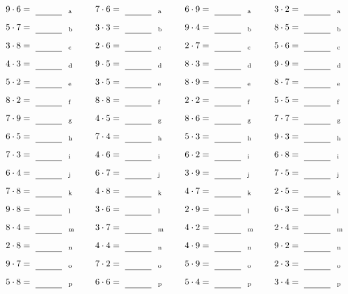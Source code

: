 \documentclass
[
  draft    = true,
  fontsize = 11pt,
  parskip  = half-
]
{scrartcl}
\begin{document}
\par\vfill\par
\begin{align*}
    \pline{9\cdot6}&=\rline{a}
  & \pline{7\cdot6}&=\rline{a}
  & \pline{6\cdot9}&=\rline{a}
  & \pline{3\cdot2}&=\rline{a} \\[1ex]
    \pline{5\cdot7}&=\rline{b}
  & \pline{3\cdot3}&=\rline{b}
  & \pline{9\cdot4}&=\rline{b}
  & \pline{8\cdot5}&=\rline{b} \\[1ex]
    \pline{3\cdot8}&=\rline{c}
  & \pline{2\cdot6}&=\rline{c}
  & \pline{2\cdot7}&=\rline{c}
  & \pline{5\cdot6}&=\rline{c} \\[1ex]
    \pline{4\cdot3}&=\rline{d}
  & \pline{9\cdot5}&=\rline{d}
  & \pline{8\cdot3}&=\rline{d}
  & \pline{9\cdot9}&=\rline{d} \\[1ex]
    \pline{5\cdot2}&=\rline{e}
  & \pline{3\cdot5}&=\rline{e}
  & \pline{8\cdot9}&=\rline{e}
  & \pline{8\cdot7}&=\rline{e} \\[1ex]
    \pline{8\cdot2}&=\rline{f}
  & \pline{8\cdot8}&=\rline{f}
  & \pline{2\cdot2}&=\rline{f}
  & \pline{5\cdot5}&=\rline{f} \\[1ex]
    \pline{7\cdot9}&=\rline{g}
  & \pline{4\cdot5}&=\rline{g}
  & \pline{8\cdot6}&=\rline{g}
  & \pline{7\cdot7}&=\rline{g} \\[1ex]
    \pline{6\cdot5}&=\rline{h}
  & \pline{7\cdot4}&=\rline{h}
  & \pline{5\cdot3}&=\rline{h}
  & \pline{9\cdot3}&=\rline{h} \\[1ex]
    \pline{7\cdot3}&=\rline{i}
  & \pline{4\cdot6}&=\rline{i}
  & \pline{6\cdot2}&=\rline{i}
  & \pline{6\cdot8}&=\rline{i} \\[1ex]
    \pline{6\cdot4}&=\rline{j}
  & \pline{6\cdot7}&=\rline{j}
  & \pline{3\cdot9}&=\rline{j}
  & \pline{7\cdot5}&=\rline{j} \\[1ex]
    \pline{7\cdot8}&=\rline{k}
  & \pline{4\cdot8}&=\rline{k}
  & \pline{4\cdot7}&=\rline{k}
  & \pline{2\cdot5}&=\rline{k} \\[1ex]
    \pline{9\cdot8}&=\rline{l}
  & \pline{3\cdot6}&=\rline{l}
  & \pline{2\cdot9}&=\rline{l}
  & \pline{6\cdot3}&=\rline{l} \\[1ex]
    \pline{8\cdot4}&=\rline{m}
  & \pline{3\cdot7}&=\rline{m}
  & \pline{4\cdot2}&=\rline{m}
  & \pline{2\cdot4}&=\rline{m} \\[1ex]
    \pline{2\cdot8}&=\rline{n}
  & \pline{4\cdot4}&=\rline{n}
  & \pline{4\cdot9}&=\rline{n}
  & \pline{9\cdot2}&=\rline{n} \\[1ex]
    \pline{9\cdot7}&=\rline{o}
  & \pline{7\cdot2}&=\rline{o}
  & \pline{5\cdot9}&=\rline{o}
  & \pline{2\cdot3}&=\rline{o} \\[1ex]
    \pline{5\cdot8}&=\rline{p}
  & \pline{6\cdot6}&=\rline{p}
  & \pline{5\cdot4}&=\rline{p}
  & \pline{3\cdot4}&=\rline{p}
\end{align*}
\end{document}
